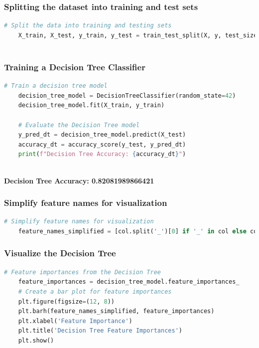 \documentclass[10pt,journal,compsoc]{IEEEtran}
\begin{document}
\subsubsection{Splitting the dataset into training and test sets}
\begin{lstlisting}[language=Python, caption={Splitting the dataset into training and test sets}, label=python_code, captionpos=b,  basicstyle=\scriptsize]
    # Split the data into training and testing sets
    X_train, X_test, y_train, y_test = train_test_split(X, y, test_size=0.2, random_state=42)
  
\end{lstlisting}

\subsubsection{Training a Decision Tree Classifier}

\begin{lstlisting}[language=Python, caption={Training a Decision Tree Classifier}, label=python_code, captionpos=b,  basicstyle=\scriptsize]
    # Train a decision tree model
    decision_tree_model = DecisionTreeClassifier(random_state=42)
    decision_tree_model.fit(X_train, y_train)
    
    # Evaluate the Decision Tree model
    y_pred_dt = decision_tree_model.predict(X_test)
    accuracy_dt = accuracy_score(y_test, y_pred_dt)
    print(f"Decision Tree Accuracy: {accuracy_dt}")
    
\end{lstlisting}

\textbf{Decision Tree Accuracy: 0.82081989866421}

\subsubsection{Simplify feature names for visualization}
\begin{lstlisting}[language=Python, captionpos=b,  basicstyle=\scriptsize]
    # Simplify feature names for visualization
    feature_names_simplified = [col.split('_')[0] if '_' in col else col for col in X.columns]
\end{lstlisting}



\subsubsection{Visualize the Decision Tree}
\begin{lstlisting}[language=Python, caption={Visualize the Decision Tree}, label=python_code, captionpos=b,  basicstyle=\scriptsize]
    # Feature importances from the Decision Tree
    feature_importances = decision_tree_model.feature_importances_
    # Create a bar plot for feature importances
    plt.figure(figsize=(12, 8))
    plt.barh(feature_names_simplified, feature_importances)
    plt.xlabel('Feature Importance')
    plt.title('Decision Tree Feature Importances')
    plt.show()    
\end{lstlisting}
\end{document}
